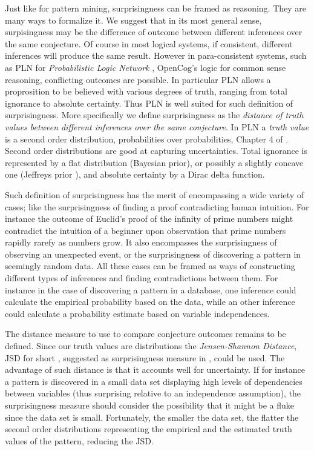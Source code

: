 \documentclass[runningheads]{llncs}
\begin{document}
Just like for pattern mining, surprisingness can be framed as
reasoning. They are many ways to formalize it. We suggest that in its
most general sense, surpisingness may be the difference of outcome
between different inferences over the same conjecture. Of course in
most logical systems, if consistent, different inferences will produce
the same result. However in para-consistent systems, such as PLN for
\emph{Probabilistic Logic Network} \cite{Goertzel2009PLN}, OpenCog's
logic for common sense reasoning, conflicting outcomes are
possible. In particular PLN allows a proprosition to be believed with
various degrees of truth, ranging from total ignorance to absolute
certainty. Thus PLN is well suited for such definition of
surprisingness. More specifically we define surprisingness as the
\emph{distance of truth values between different inferences over the
  same conjecture}. In PLN a \emph{truth value} is a second order
distribution, probabilities over probabilities, Chapter 4 of
\cite{Goertzel2009PLN}. Second order distributions are good at
capturing uncertainties. Total ignorance is represented by a flat
distribution (Bayesian prior), or possibly a slightly concave one
(Jeffreys prior \cite{Jeffreys46Invariant}), and absolute certainty by
a Dirac delta function.

Such definition of surprisingness has the merit of encompassing a wide
variety of cases; like the surprisingness of finding a proof
contradicting human intuition. For instance the outcome of Euclid's
proof of the infinity of prime numbers might contradict the intuition
of a beginner upon observation that prime numbers rapidly rarefy as
numbers grow. It also encompasses the surprisingness of observing an
unexpected event, or the surprisingness of discovering a pattern in
seemingly random data. All these cases can be framed as ways of
constructing different types of inferences and finding contradictions
between them. For instance in the case of discovering a pattern in a
database, one inference could calculate the empirical probability
based on the data, while an other inference could calculate a
probability estimate based on variable independences.

The distance measure to use to compare conjecture outcomes remains to
be defined. Since our truth values are distributions the
\emph{Jensen-Shannon Distance}, JSD for short \cite{Endres2003A},
suggested as surprisingness measure in \cite{Pienta2015AN},
could be used. The advantage of such distance is that it accounts well
for uncertainty. If for instance a pattern is discovered in a small
data set displaying high levels of dependencies between variables
(thus surprising relative to an independence assumption), the
surprisingness measure should consider the possibility that it might
be a fluke since the data set is small. Fortunately, the smaller the
data set, the flatter the second order distributions representing the
empirical and the estimated truth values of the pattern, reducing the
JSD.
\end{document}
